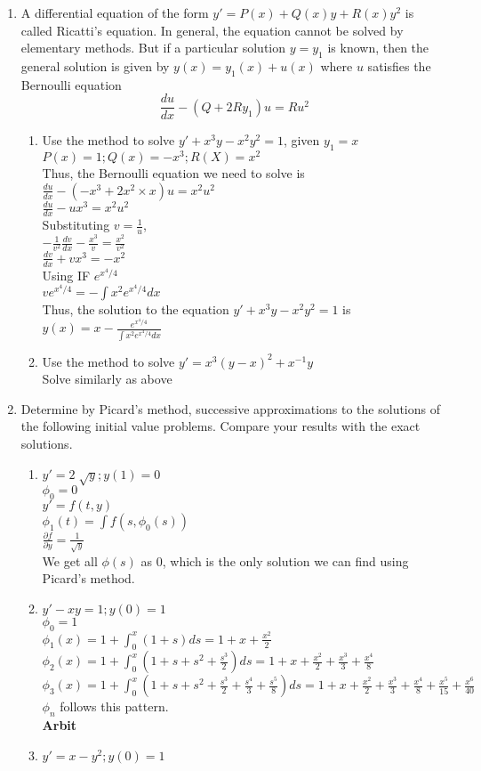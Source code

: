 \documentclass[a4paper]{article}
\begin{document}
\begin{enumerate}
\item{A differential equation of the form $y'=P(x)+Q(x)y+R(x)y^2$ is called Ricatti's equation. In general, the equation cannot be solved by elementary methods. But if a particular solution $y=y_1$ is known, then the general solution is given by $y(x)=y_1(x)+u(x)$ where $u$ satisfies the Bernoulli equation
\[\frac{du}{dx}-(Q+2Ry_1)u=Ru^2\]
\begin{enumerate}
\item{Use the method to solve $y'+x^3y-x^2y^2=1$, given $y_1=x$
\\$P(x)=1; Q(x)=-x^3; R(X)=x^2$
\\Thus, the Bernoulli equation we need to solve is
\\$\frac{du}{dx}-(-x^3+2x^2\times x)u=x^2u^2$
\\$\frac{du}{dx}-ux^3=x^2u^2$
\\Substituting $v=\frac{1}{u}$,
\\$-\frac{1}{v^2}\frac{dv}{dx}-\frac{x^3}{v}=\frac{x^2}{v^2}$
\\$\frac{dv}{dx}+vx^3=-x^2$
\\Using IF $e^{x^4/4}$
\\$ve^{x^4/4}=-\int x^2e^{x^4/4} dx$
\\Thus, the solution to the equation $y'+x^3y-x^2y^2=1$ is
\\$y(x)=x-\frac{e^{x^4/4}}{\int x^2e^{x^4/4} dx}$
}
\item{Use the method to solve $y'=x^3(y-x)^2+x^{-1}y$
\\Solve similarly as above
}
\end{enumerate}
}
\item{Determine by Picard's method, successive approximations to the solutions of the following initial value problems. Compare your results with the exact solutions.
\begin{enumerate}
\item $y'=2\sqrt[]{y}; y(1)=0$\\
$\phi_0=0$\\
$y'=f(t,y)$\\
$\phi_1(t)=\int f(s,\phi_0(s))$\\
$\frac{\partial f}{\partial y}=\frac{1}{\sqrt{y}}$\\
We get all $\phi(s)$ as $0$, which is the only solution we can find using Picard's method.
\item $y'-xy=1; y(0)=1$ \\
$\phi_0=1$\\
$\phi_1(x)=1+\int_0^x (1+s) ds=1+x+\frac{x^2}{2}$\\
$\phi_2(x)=1+\int_0^x (1+s+s^2+\frac{s^3}{2}) ds=1+x+\frac{x^2}{2}+\frac{x^3}{3}+\frac{x^4}{8}$\\
$\phi_3(x)=1+\int_0^x (1+s+s^2+\frac{s^3}{2} +\frac{s^4}{3}+\frac{s^5}{8}) ds=1+x+\frac{x^2}{2}+\frac{x^3}{3}+\frac{x^4}{8}+\frac{x^5}{15}+\frac{x^6}{40}$\\
$\phi_n$ follows this pattern.\\
\textbf{Arbit}

\item $y'=x-y^2; y(0)=1$ 
\end{enumerate}
}
\end{enumerate}
\end{document}
